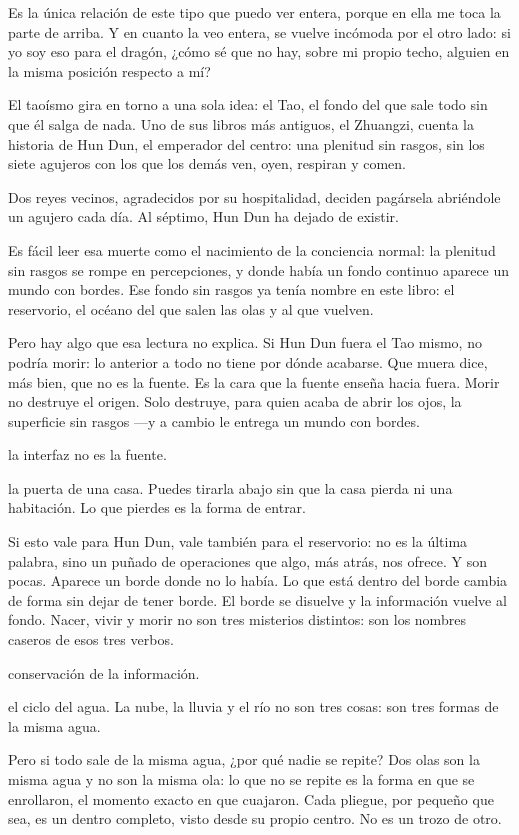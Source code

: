 Es la única relación de este tipo que puedo ver entera, porque en ella me toca la parte de arriba. Y en cuanto la veo entera, se vuelve incómoda por el otro lado: si yo soy eso para el dragón, ¿cómo sé que no hay, sobre mi propio techo, alguien en la misma posición respecto a mí?

\noindent El taoísmo gira en torno a una sola idea: el Tao, el fondo del que sale todo sin que él salga de nada. Uno de sus libros más antiguos, el Zhuangzi, cuenta la historia de Hun Dun, el emperador del centro: una plenitud sin rasgos, sin los siete agujeros con los que los demás ven, oyen, respiran y comen.

Dos reyes vecinos, agradecidos por su hospitalidad, deciden pagársela abriéndole un agujero cada día. Al séptimo, Hun Dun ha dejado de existir.

Es fácil leer esa muerte como el nacimiento de la conciencia normal: la plenitud sin rasgos se rompe en percepciones, y donde había un fondo continuo aparece un mundo con bordes. Ese fondo sin rasgos ya tenía nombre en este libro: el reservorio, el océano del que salen las olas y al que vuelven.

Pero hay algo que esa lectura no explica. Si Hun Dun fuera el Tao mismo, no podría morir: lo anterior a todo no tiene por dónde acabarse. Que muera dice, más bien, que no es la fuente. Es la cara que la fuente enseña hacia fuera. Morir no destruye el origen. Solo destruye, para quien acaba de abrir los ojos, la superficie sin rasgos —y a cambio le entrega un mundo con bordes.

\begin{fisica}
 la interfaz no es la fuente.

 la puerta de una casa. Puedes tirarla abajo sin que la casa pierda ni una habitación. Lo que pierdes es la forma de entrar.
\end{fisica}
\noindent Si esto vale para Hun Dun, vale también para el reservorio: no es la última palabra, sino un puñado de operaciones que algo, más atrás, nos ofrece. Y son pocas. Aparece un borde donde no lo había. Lo que está dentro del borde cambia de forma sin dejar de tener borde. El borde se disuelve y la información vuelve al fondo. Nacer, vivir y morir no son tres misterios distintos: son los nombres caseros de esos tres verbos.

\begin{fisica}
 conservación de la información.

 el ciclo del agua. La nube, la lluvia y el río no son tres cosas: son tres formas de la misma agua.
\end{fisica}
Pero si todo sale de la misma agua, ¿por qué nadie se repite? Dos olas son la misma agua y no son la misma ola: lo que no se repite es la forma en que se enrollaron, el momento exacto en que cuajaron. Cada pliegue, por pequeño que sea, es un dentro completo, visto desde su propio centro. No es un trozo de otro.

